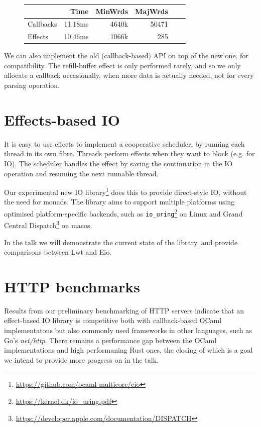 \documentclass[a4paper,twocolumn]{article}
\begin{document}
\begin{figure}[h]
\begin{tabular}{l|rrrrr}
          & Time     & MinWrds &  MajWrds \\
\hline
Callbacks & 11.18ms  & 4640k   &    50471 \\
Effects   & 10.46ms  & 1066k   &      285 \\
\end{tabular}
\end{figure}

We can also implement the old (callback-based) API on top of the new one, for compatibility.
The refill-buffer effect is only performed rarely, and so we only allocate a callback occasionally,
when more data is actually needed, not for every parsing operation.


\section*{Effects-based IO}

It is easy to use effects to implement a cooperative scheduler,
by running each thread in its own fibre.
Threads perform effects when they want to block (e.g. for IO).
The scheduler handles the effect by saving the continuation in the IO operation and resuming the next runnable thread.

Our experimental new IO library\footnote{\url{https://github.com/ocaml-multicore/eio}}
does this to provide direct-style IO, without the need for monads.
The library aims to support multiple platforms using optimised platform-specific backends,
such as {\tt io\_uring}\footnote{\url{https://kernel.dk/io_uring.pdf}} on Linux and
Grand Central Dispatch\footnote{\url{https://developer.apple.com/documentation/DISPATCH}} on macos.

In the talk we will demonstrate the current state of the library, and provide comparisons between Lwt and Eio.

\section*{HTTP benchmarks}

Results from our preliminary benchmarking of HTTP servers indicate that an effect-based IO library is competitive both with callback-based OCaml implementatons but also commonly used frameworks in other languages, such as Go's \emph{net/http}. There remains a performance gap between the OCaml implementations and high performaning Rust ones, the closing of which is a goal we intend to provide more progress on in the talk.
\end{document}
